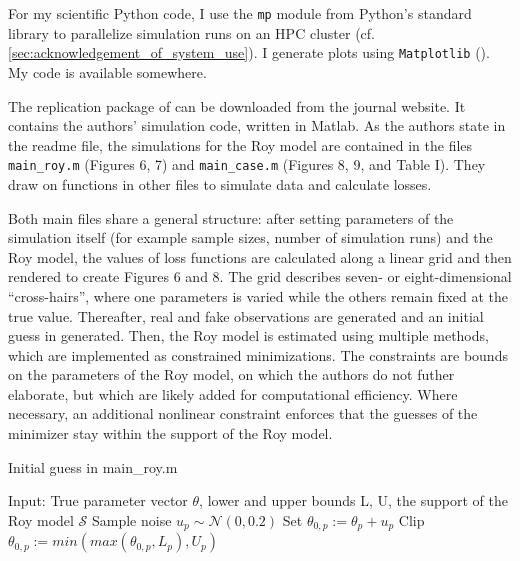 For my scientific Python code, I use the \texttt{mp} module from Python's standard library to parallelize simulation runs on an HPC cluster (cf. \ref{sec:acknowledgement_of_system_use}).
I generate plots using \texttt{Matplotlib} (\cite{Matplotlib}).
My code is available somewhere. %

The replication package of \cite{kaji2023adversarial} can be downloaded from the journal website.
It contains the authors' simulation code, written in Matlab. %
As the authors state in the readme file, the simulations for the Roy model are contained in the files \texttt{main\_roy.m} (Figures 6, 7) and \texttt{main\_case.m} (Figures 8, 9, and Table I).
They draw on functions in other files to simulate data and calculate losses.

Both main files share a general structure:
after setting parameters of the simulation itself (for example sample sizes, number of simulation runs) and the Roy model, the values of loss functions are calculated along a linear grid and then rendered to create Figures 6 and 8.
The grid describes seven- or eight-dimensional ``cross-hairs'', where one parameters is varied while the others remain fixed at the true value.
Thereafter, real and fake observations are generated and an initial guess in generated.
Then, the Roy model is estimated using multiple methods, which are implemented as constrained minimizations.%
The constraints are bounds on the parameters of the Roy model, on which the authors do not futher elaborate, but which are likely added for computational efficiency. %
Where necessary, an additional nonlinear constraint enforces that the guesses of the minimizer stay within the support of the Roy model.

\begin{algorithm}
    \caption{Initial guess in main\_roy.m}
    \label{alg:theta0}
    \begin{algorithmic}[1]
        \STATE Input: True parameter vector $\theta$, lower and upper bounds L, U, the support of the Roy model $\mathcal{S}$
            \STATE Sample noise $u_p \sim \mathcal{N}(0, 0.2)$
            \STATE Set $\theta_{0,p} := \theta_p + u_p$
            \STATE Clip $\theta_{0,p} := min(max(\theta_{0,p}, L_p), U_p)$
        \ENDWHILE
    \end{algorithmic}
\end{algorithm}

